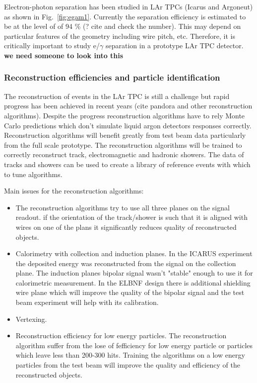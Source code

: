 Electron-photon separation has been studied in LAr TPCs
(Icarus and Argoneut) as shown in Fig.~\ref{fig:egam1}.
Currently the 
separation efficiency is estimated to be at the level of of 94 \% (? cite and 
check the number). 
This may depend on particular features of the geometry including wire pitch, etc.
Therefore, it is critically important 
to study e/$\gamma$ separation in a prototype LAr TPC detector.
{\bf we need someone to look into this}



\subsubsection{Reconstruction efficiencies and particle identification}
\label{detbeam_pid}

The reconstruction of events in the LAr TPC is still a challenge but rapid progress has been achieved in recent years (cite pandora and other reconstruction algorithms). Despite the progress reconstruction algorithms have to rely Monte Carlo predictions which don't simulate liquid argon detectors responses correctly. Reconstruction algorithms will benefit greatly from test beam data particularly from the full scale prototype. The reconstruction algorithms will be trained to correctly reconstruct track, electromagnetic and hadronic showers.
The data of tracks and showers can be used to create a library of reference events with which to tune algorithms.

Main issues for the reconstruction algorithms:
\begin{itemize}
\item The reconstruction algorithms try to use all three planes on the signal readout. if the orientation of the track/shower is such that it is aligned with wires on one of the plans it significantly reduces quality of reconstructed objects. 
\item Calorimetry with collection and induction planes. In the ICARUS experiment the deposited energy was reconstructed from the signal on the collection plane. The induction planes bipolar signal wasn't "stable" enough to use it for calorimetric measurement. In the ELBNF design there is additional shielding  wire plane which will improve the quality of the bipolar signal and the  test beam experiment will help with its calibration.
\item   Vertexing.
\item Reconstruction efficiency for low energy particles. The reconstruction algorithm suffer from the lose of fefficiency for low energy particle or particles which leave less than 200-300 hits. Training the algorithms on a low energy particles from the test beam will improve the quality and efficiency of the reconstructed objects.
\end{itemize}



